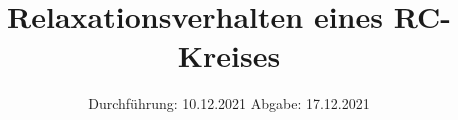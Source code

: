 

\subject{VERSUCH 353}
\title{Relaxationsverhalten eines RC-Kreises}
\date{%
  Durchführung: 10.12.2021
  \hspace{3em}
  Abgabe: 17.12.2021
}



\maketitle
\thispagestyle{empty}
\tableofcontents
\newpage







\printbibliography{}


